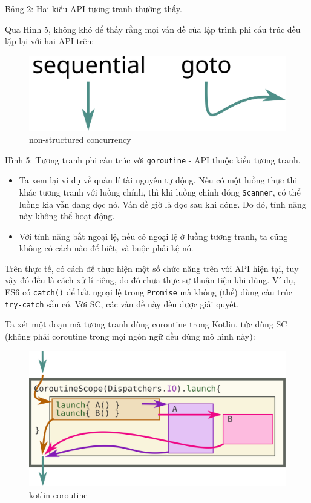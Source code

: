 Bảng 2: Hai kiểu API tương tranh thường thấy.

Qua Hình 5, không khó để thấy rằng mọi vấn đề của lập trình phi cấu trúc
đều lặp lại với hai API trên:

\begin{figure}
  \centering
  \includegraphics{../images/sequential-and-go-to-schematic.svg}
  \caption{non-structured concurrency}
\end{figure}

Hình 5: Tương tranh phi cấu trúc với \texttt{goroutine} - API thuộc kiểu
tương tranh.

\begin{itemize}
  
  \item
        Ta xem lại ví dụ về quản lí tài nguyên tự động. Nếu có một luồng thực
        thi khác tương tranh với luồng chính, thì khi luồng chính đóng
        \texttt{Scanner}, có thể luồng kia vẫn đang đọc nó. Vấn đề giờ là đọc
        sau khi đóng. Do đó, tính năng này không thể hoạt động.
  \item
        Với tính năng bắt ngoại lệ, nếu có ngoại lệ ở luồng tương tranh, ta
        cũng không có cách nào để biết, và buộc phải kệ nó.
\end{itemize}

Trên thực tế, có cách để thực hiện một số chức năng trên với API hiện
tại, tuy vậy đó đều là cách xử lí riêng, do đó chưa thực sự thuận tiện
khi dùng. Ví dụ, ES6 có \texttt{catch()} để bắt ngoại lệ trong
\texttt{Promise} mà không (thể) dùng cấu trúc \texttt{try-catch} sẵn có.
Với SC, các vấn đề này đều được giải quyết.

Ta xét một đoạn mã tương tranh dùng coroutine trong Kotlin, tức dùng SC
(không phải coroutine trong mọi ngôn ngữ đều dùng mô hình này):

\begin{figure}
  \centering
  \includegraphics{../images/kotlin-coroutine.svg}
  \caption{kotlin coroutine}
\end{figure}

